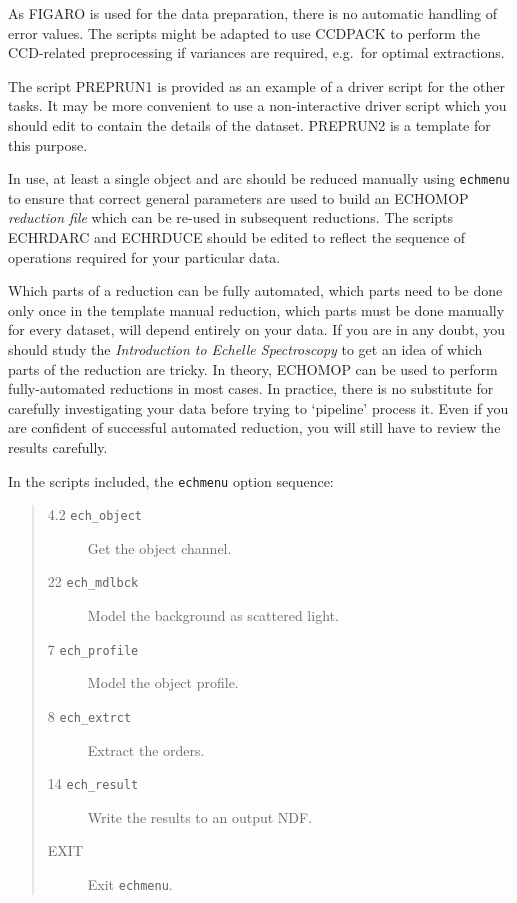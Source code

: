 \documentclass[twoside,11pt]{article}
\newcommand{\xref}[3]{#1}
\begin{document}
As FIGARO is used for the data preparation, there is no automatic handling of
error values.  The scripts might be adapted to use \xref{CCDPACK}{sun139}{}
to perform the CCD-related preprocessing if variances are required, e.g.\ for
optimal extractions.

The script PREPRUN1 is provided as an example of a driver script for the
other tasks.
It may be more convenient to use a non-interactive driver script which you
should edit to contain the details of the dataset.
PREPRUN2 is a template for this purpose.

In use, at least a single object and arc should be reduced manually using
{\tt echmenu} to ensure that correct general parameters are used to
build an ECHOMOP {\em reduction file} which can be re-used in subsequent
reductions.  The scripts ECHRDARC and ECHRDUCE should be edited to
reflect the sequence of operations required for your particular data.

Which parts of a reduction can be fully automated, which parts need to be
done only once in the template manual reduction, which parts must be done
manually for every dataset, will depend entirely on your data.  If you are in
any doubt, you should study the \xref{{\sl Introduction to Echelle
Spectroscopy}}{sg9}{} to get an idea of which parts of the reduction are tricky.
In theory, ECHOMOP can be used to perform fully-automated reductions in most
cases.  In practice, there is no substitute for carefully investigating your
data before trying to `pipeline' process it.  Even if you are confident of
successful automated reduction, you will still have to review the results
carefully.

In the scripts included, the \xref{{\tt echmenu}}{sun152}{ECHMENU} option
sequence:

\begin{quote}
\begin{description}

\item [4.2 \xref{{\tt ech\_object}}{sun152}{ech_spatial}]
      Get the object channel.

\item [22 \xref{{\tt ech\_mdlbck}}{sun152}{ech_mdlbck}]
      Model the background as scattered light.

\item [7 \xref{{\tt ech\_profile}}{sun152}{ech_profile}]
      Model the object profile.

\item [8 \xref{{\tt ech\_extrct}}{sun152}{ech_extrct}]
      Extract the orders.

\item [14 \xref{{\tt ech\_result}}{sun152}{ech_result}]
      Write the results to an output NDF\@.

\item [EXIT]
      Exit {\tt echmenu}.

\end{description}
\end{quote}
\end{document}
